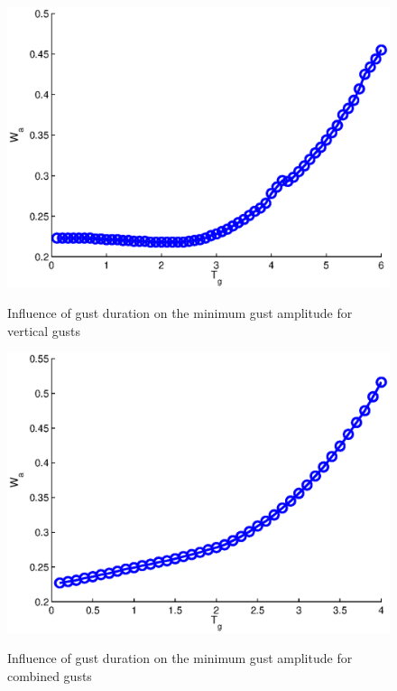 \begin{figure}[h!]
  \begin{center}
    \scalebox{1.0}
    {\includegraphics{./Figures/Wg_vs_TG_windtype=1_alhpamax=12_nodalphalimit.eps}}
  \end{center}
  \caption{Influence of gust duration on the minimum gust amplitude for vertical gusts}
  \label{fig:vertical_amplitude_duration}
\end{figure}
\FloatBarrier
\begin{figure}[h!]
  \begin{center}
    \scalebox{1.0}
    {\includegraphics{./Figures/Wg_vs_TG_windtype=3_alhpamax=12_nodalphalimit.eps}}
  \end{center}
  \caption{Influence of gust duration on the minimum gust amplitude for combined gusts}
  \label{fig:combined_amplitude_duration}
\end{figure}

